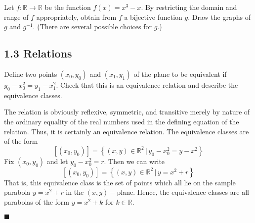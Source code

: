 \documentclass[12pt]{article}
\renewcommand{\qed}{\hfill$\blacksquare$}
\renewenvironment{proof}{\begin{addmargin}[1em]{0em}\begin{newproof}}{\end{newproof}\end{addmargin}\qed}
\newenvironment{problem}[2][Exercise]{\begin{trivlist}
\item[\hskip \labelsep {\bfseries #1}\hskip \labelsep {\bfseries #2.}]}{\end{trivlist}}
\begin{document}
\begin{problem}{1.2.6}
Let $f:\mathbb{R}\rightarrow \mathbb{R}$ be the function $f\left(x\right) = x^3 - x$. By restricting the domain and range of $f$ appropriately, obtain from $f$ a bijective function $g$. Draw the graphs of $g$ and $g^{-1}$. (There are several possible choices for $g$.)
\end{problem}


\subsection*{1.3 Relations}

\begin{problem}{1.3.1}
Define two points $\left(x_0,y_0\right)$ and $\left(x_1,y_1\right)$ of the plane to be equivalent if $y_0 - x_0^2 = y_1 - x_1^2$. Check that this is an equivalence relation and describe the equivalence classes.
\end{problem}
\begin{proof}
The relation is obviously reflexive, symmetric, and transitive merely by nature of the ordinary equality of the real numbers used in the defining equation of the relation. Thus, it is certainly an equivalence relation. The equivalence classes are of the form
\[ \left[ \left(x_0,y_0\right)\right] = \left\{ \left(x,y\right) \in \mathbb{R}^2 \, | \, y_0 - x_0^2 = y-x^2 \right\} \] Fix $\left(x_0,y_0\right)$ and let $y_0 - x_0^2 = r$. Then we can write \[ \left[ \left(x_0,y_0\right) \right] = \left\{ \left(x,y\right) \in \mathbb{R}^2 \, | \, y= x^2 + r \right\} \]
That is, this equivalence class is the set of points which all lie on the sample parabola $y=x^2 + r$ in the $\left(x,y\right)-$plane. Hence, the equivalence classes are all parabolas of the form $y = x^2 + k$ for $k \in \mathbb{R}$.
\end{proof}
\end{document}
